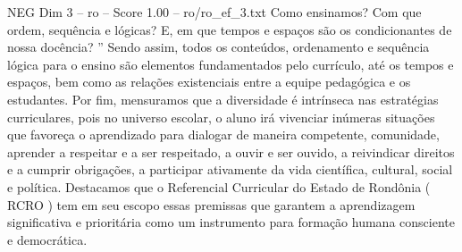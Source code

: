 \begin{textsample}{NEG Dim 3 – ro – Score 1.00 – ro/ro\_ef\_3.txt}
Como ensinamos?
Com que ordem, sequência e lógicas?
E, em que tempos e espaços são os condicionantes de nossa docência? ” Sendo assim, todos os conteúdos, ordenamento e sequência lógica para o ensino são elementos fundamentados pelo currículo, até os tempos e espaços, bem como as relações existenciais entre a equipe pedagógica e os estudantes.
Por fim, mensuramos que a diversidade é intrínseca nas estratégias curriculares, pois no universo escolar, o aluno irá vivenciar inúmeras situações que favoreça o aprendizado para dialogar de maneira competente, comunidade, aprender a respeitar e a ser respeitado, a ouvir e ser ouvido, a reivindicar direitos e a cumprir obrigações, a participar ativamente da vida científica, cultural, social e política.
Destacamos que o Referencial Curricular do Estado de Rondônia ( RCRO ) tem em seu escopo essas premissas que garantem a aprendizagem significativa e prioritária como um instrumento para formação humana consciente e democrática.

\end{textsample}
